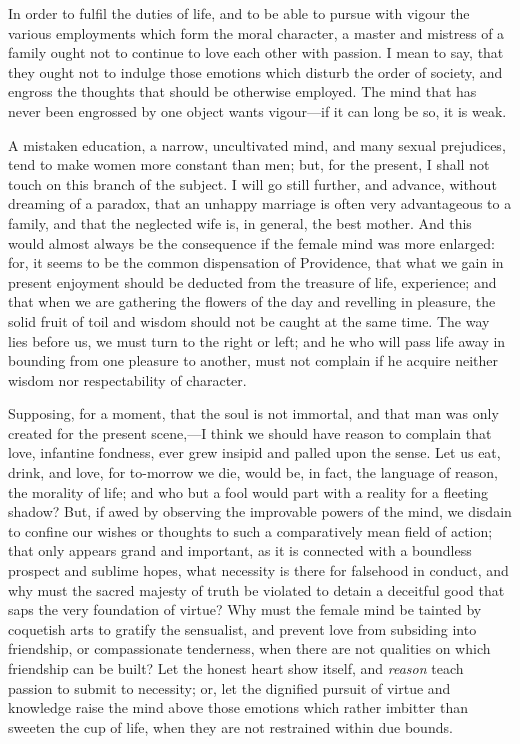 In order to fulfil the duties of life, and to be able to pursue with
vigour the various employments which form the moral character, a
master and mistress of a family ought not to continue to love each
other with passion. I mean to say, that they ought not to indulge
those emotions which disturb the order of society, and engross the
thoughts that should  be otherwise employed. The mind that
has never been engrossed by one object wants vigour---if it can long
be so, it is weak.

A mistaken education, a narrow, uncultivated mind, and many sexual
prejudices, tend to make women more constant than men; but, for the
present, I shall not touch on this branch of the subject. I will go
still further, and advance, without dreaming of a paradox, that an
unhappy marriage is often very advantageous to a family, and that the
neglected wife is, in general, the best mother. And this would almost
always be the consequence if the female mind was more enlarged: for,
it seems to be the common dispensation of Providence, that what we
gain in present enjoyment should be deducted from the treasure of
life, experience; and that when we are gathering the flowers of the
day and revelling in pleasure, the solid fruit of toil and wisdom
should not be caught at the same time. The way lies before us, we must
turn to the right or left; and he who will pass life away in bounding
from one pleasure to another, must not complain if he acquire neither
wisdom nor respectability of character.

Supposing, for a moment, that the soul is not immortal, and
that man was only created for the present scene,---I think we should
have reason to complain that love, infantine fondness, ever grew
insipid and palled upon the sense. Let us eat, drink, and love, for
to-morrow we die, would be, in fact, the language of reason, the
morality of life; and who but a fool would part with a reality for a
fleeting shadow? But, if awed by observing the improvable powers of
the mind, we disdain to confine our wishes or thoughts to such a
comparatively mean field of action; that only appears grand and
important, as it is connected with a boundless prospect and sublime
hopes, what necessity is there for falsehood in conduct, and why must
the sacred majesty of truth be violated to detain a deceitful good
that saps the very foundation of virtue? Why must the female mind be
tainted by coquetish arts to gratify the sensualist, and prevent love
from subsiding into friendship, or compassionate tenderness, when
there are not qualities on which friendship can be built? Let the
honest heart show itself, and \textit{reason} teach passion to submit
to necessity; or, let  the dignified pursuit of virtue and
knowledge raise the mind above those emotions which rather imbitter
than sweeten the cup of life, when they are not restrained within due
bounds.

